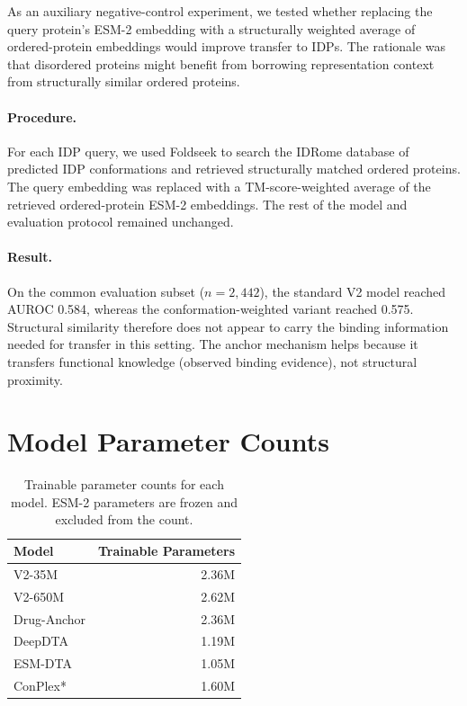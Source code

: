 \documentclass[11pt]{article}
\begin{document}
As an auxiliary negative-control experiment, we tested whether replacing the query protein's ESM-2 embedding with a structurally weighted average of ordered-protein embeddings would improve transfer to IDPs. The rationale was that disordered proteins might benefit from borrowing representation context from structurally similar ordered proteins.

\paragraph{Procedure.}
For each IDP query, we used Foldseek to search the IDRome database of predicted IDP conformations and retrieved structurally matched ordered proteins. The query embedding was replaced with a TM-score-weighted average of the retrieved ordered-protein ESM-2 embeddings. The rest of the model and evaluation protocol remained unchanged.

\paragraph{Result.}
On the common evaluation subset ($n = 2{,}442$), the standard V2 model reached AUROC 0.584, whereas the conformation-weighted variant reached 0.575. Structural similarity therefore does not appear to carry the binding information needed for transfer in this setting. The anchor mechanism helps because it transfers functional knowledge (observed binding evidence), not structural proximity.

\section{Model Parameter Counts}
\label{sec:params}

\begin{table}[h]
\centering
\caption{Trainable parameter counts for each model. ESM-2 parameters are frozen and excluded from the count.}
\label{tab:param_counts}
\begin{tabular}{lr}
\toprule
Model & Trainable Parameters \\
\midrule
V2-35M & 2.36M \\
V2-650M & 2.62M \\
Drug-Anchor & 2.36M \\
DeepDTA & 1.19M \\
ESM-DTA & 1.05M \\
ConPlex* & 1.60M \\
\bottomrule
\end{tabular}
\end{table}
\end{document}
